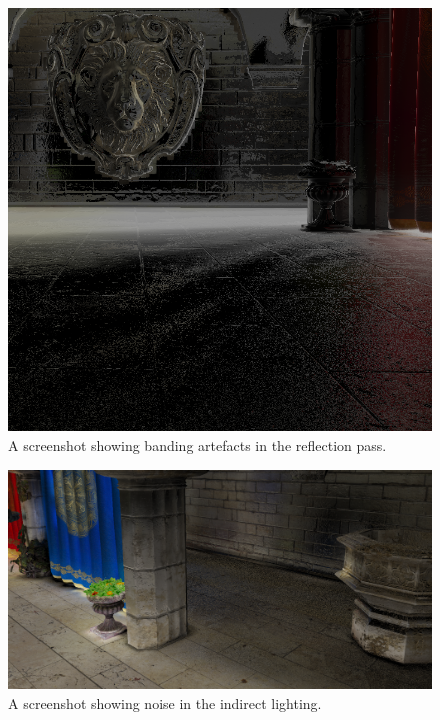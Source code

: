 \documentclass[]{acmsiggraph}
\begin{document}
\begin{figure}[htbp]\centering
 \includegraphics[width=1.0\linewidth]{images/banding.png}
 \caption{A screenshot showing banding artefacts in the reflection pass.}
\end{figure}

\begin{figure}[htbp]\centering
 \includegraphics[width=1.0\linewidth]{images/indirect_noise.png}
 \caption{A screenshot showing noise in the indirect lighting.}
\end{figure}
\end{document}
